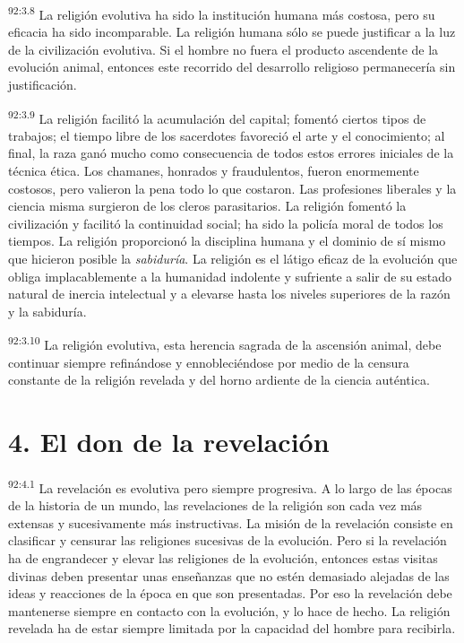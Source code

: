 \par
\textsuperscript{92:3.8} La religión evolutiva ha sido la institución humana más costosa, pero su eficacia ha sido incomparable. La religión humana sólo se puede justificar a la luz de la civilización evolutiva. Si el hombre no fuera el producto ascendente de la evolución animal, entonces este recorrido del desarrollo religioso permanecería sin justificación.

\par
\textsuperscript{92:3.9} La religión facilitó la acumulación del capital; fomentó ciertos tipos de trabajos; el tiempo libre de los sacerdotes favoreció el arte y el conocimiento; al final, la raza ganó mucho como consecuencia de todos estos errores iniciales de la técnica ética. Los chamanes, honrados y fraudulentos, fueron enormemente costosos, pero valieron la pena todo lo que costaron. Las profesiones liberales y la ciencia misma surgieron de los cleros parasitarios. La religión fomentó la civilización y facilitó la continuidad social; ha sido la policía moral de todos los tiempos. La religión proporcionó la disciplina humana y el dominio de sí mismo que hicieron posible la \textit{sabiduría}. La religión es el látigo eficaz de la evolución que obliga implacablemente a la humanidad indolente y sufriente a salir de su estado natural de inercia intelectual y a elevarse hasta los niveles superiores de la razón y la sabiduría.

\par
\textsuperscript{92:3.10} La religión evolutiva, esta herencia sagrada de la ascensión animal, debe continuar siempre refinándose y ennobleciéndose por medio de la censura constante de la religión revelada y del horno ardiente de la ciencia auténtica.

\section*{4. El don de la revelación}
\par
\textsuperscript{92:4.1} La revelación es evolutiva pero siempre progresiva. A lo largo de las épocas de la historia de un mundo, las revelaciones de la religión son cada vez más extensas y sucesivamente más instructivas. La misión de la revelación consiste en clasificar y censurar las religiones sucesivas de la evolución. Pero si la revelación ha de engrandecer y elevar las religiones de la evolución, entonces estas visitas divinas deben presentar unas enseñanzas que no estén demasiado alejadas de las ideas y reacciones de la época en que son presentadas. Por eso la revelación debe mantenerse siempre en contacto con la evolución, y lo hace de hecho. La religión revelada ha de estar siempre limitada por la capacidad del hombre para recibirla.

